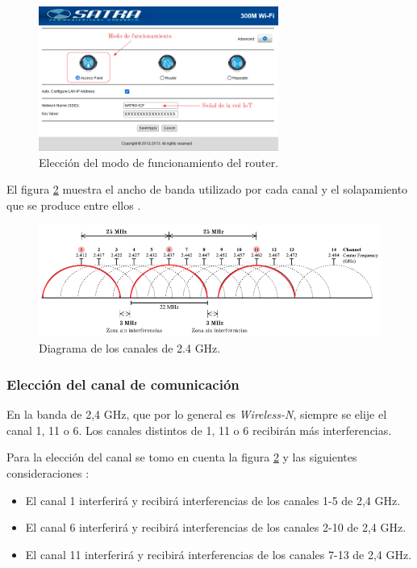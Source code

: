 \begin{figure}[htpb]
\centering 
\includegraphics[width=0.7\textwidth]{./Figures/funcionamientorouter.png}
\caption{Elección del modo de funcionamiento del router.}
\label{fig:funcionamientorouter}
\end{figure}

El figura \ref{fig:canales} muestra el ancho de banda utilizado por cada canal y el solapamiento que se produce entre ellos \citep{WEBSITE:27}.

\begin{figure}[htpb]
\centering 
\includegraphics[width=1.0\textwidth]{./Figures/canales.png}
\caption{Diagrama de los canales de 2.4 GHz.}
\label{fig:canales}
\end{figure}

\subsubsection{Elección del canal de comunicación}
En la banda de 2,4 GHz, que por lo general es \emph{Wireless-N}, siempre se elije el canal 1, 11 o 6. Los canales distintos de 1, 11 o 6 recibirán más interferencias. 

Para la elección del canal se tomo en cuenta la figura  \ref{fig:canales} y las siguientes consideraciones \citep{WEBSITE:28}:

\begin{itemize}
\item El canal 1 interferirá y recibirá interferencias de los canales 1-5 de  2,4 GHz.
\item El canal 6 interferirá y recibirá interferencias de los canales 2-10 de  2,4 GHz.
\item El canal 11 interferirá y recibirá interferencias de los canales 7-13 de 2,4 GHz.
\end{itemize}

